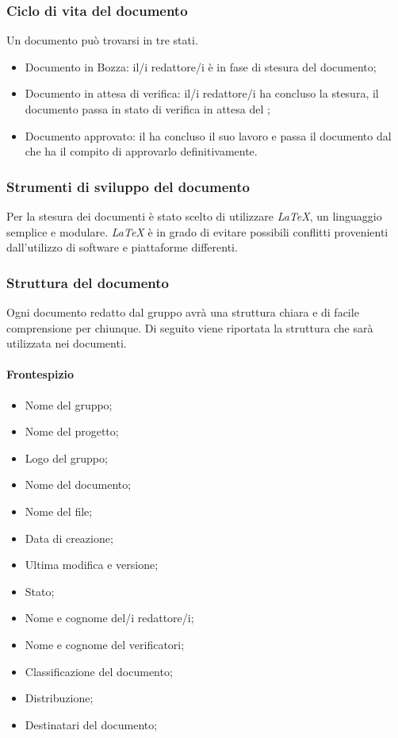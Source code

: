 	\subsubsection{Ciclo di vita del documento}
	Un documento può trovarsi in tre stati. 
	\begin{itemize}
		\item{Documento in Bozza}: il/i redattore/i è in fase di stesura del documento;
		\item{Documento in attesa di verifica}: il/i redattore/i ha concluso la stesura, il documento passa in stato di verifica in attesa del \textit{\Ver};
		\item{Documento approvato}: il \textit{\Ver} ha concluso il suo lavoro e passa il documento dal \textit{\RdP} che ha il compito di approvarlo definitivamente.
	\end{itemize}

	\subsubsection{Strumenti di sviluppo del documento}
	Per la stesura dei documenti è stato scelto di utilizzare \textit{\LaTeX{}}, un linguaggio semplice e modulare. \textit{\LaTeX{}} è in grado di evitare possibili conflitti provenienti dall’utilizzo di software e piattaforme differenti.
	
	\subsubsection{Struttura del documento}
	Ogni documento redatto dal gruppo avrà una struttura chiara e di facile comprensione per chiunque. Di seguito viene riportata la struttura che sarà utilizzata nei documenti.
		\paragraph{Frontespizio}
			\begin{itemize}
				\item{Nome del gruppo;}
				\item{Nome del progetto;}
				\item{Logo del gruppo;}
				\item{Nome del documento;}
				\item{Nome del file;}
				\item{Data di creazione;}
				\item{Ultima modifica e versione;}
				\item{Stato;}
				\item{Nome e cognome del/i redattore/i;}
				\item{Nome e cognome del verificatori;}
				\item{Classificazione del documento;}
				\item{Distribuzione;}
				\item{Destinatari del documento;}	
			\end{itemize}
		
